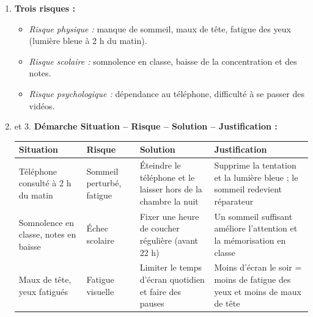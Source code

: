 \documentclass[11pt]{article}
\begin{document}
\begin{corrige}
\begin{enumerate}
\item \textbf{Trois risques :}
\begin{itemize}
\item \emph{Risque physique :} manque de sommeil, maux de tête, fatigue des yeux (lumière bleue à 2 h du matin).
\item \emph{Risque scolaire :} somnolence en classe, baisse de la concentration et des notes.
\item \emph{Risque psychologique :} dépendance au téléphone, difficulté à se passer des vidéos.
\end{itemize}
\item et 3. \textbf{Démarche Situation -- Risque -- Solution -- Justification :}
\begin{center}
\begin{tabularx}{\linewidth}{|X|X|X|X|}
\hline
\rowcolor{popblueL} \textbf{Situation} & \textbf{Risque} & \textbf{Solution} & \textbf{Justification} \\
\hline
Téléphone consulté à 2 h du matin & Sommeil perturbé, fatigue & Éteindre le téléphone et le laisser hors de la chambre la nuit & Supprime la tentation et la lumière bleue ; le sommeil redevient réparateur \\
\hline
Somnolence en classe, notes en baisse & Échec scolaire & Fixer une heure de coucher régulière (avant 22 h) & Un sommeil suffisant améliore l'attention et la mémorisation en classe \\
\hline
Maux de tête, yeux fatigués & Fatigue visuelle & Limiter le temps d'écran quotidien et faire des pauses & Moins d'écran le soir = moins de fatigue des yeux et moins de maux de tête \\
\hline
\end{tabularx}
\end{center}
\end{enumerate}
\end{corrige}
\end{document}
